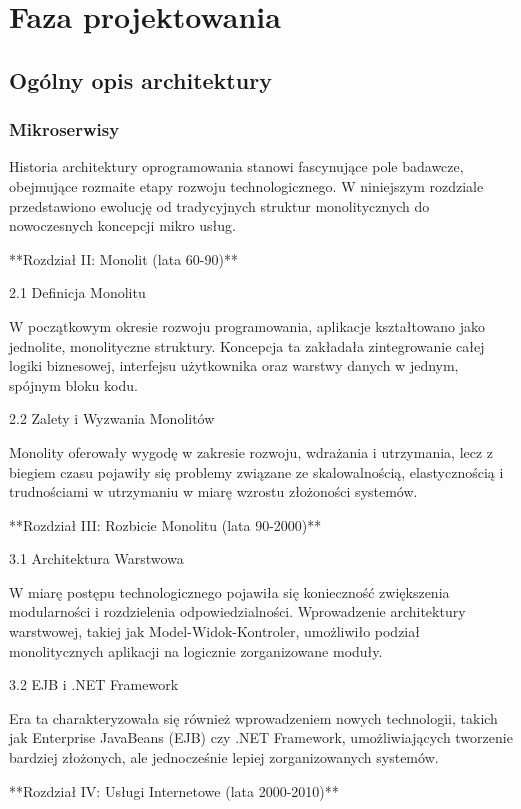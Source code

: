 \section{Faza projektowania}

\subsection{Ogólny opis architektury}

\subsubsection{Mikroserwisy}

Historia architektury oprogramowania stanowi fascynujące pole badawcze, obejmujące rozmaite etapy rozwoju technologicznego. W niniejszym rozdziale przedstawiono ewolucję od tradycyjnych struktur monolitycznych do nowoczesnych koncepcji mikro usług.

**Rozdział II: Monolit (lata 60-90)**

2.1 Definicja Monolitu

W początkowym okresie rozwoju programowania, aplikacje kształtowano jako jednolite, monolityczne struktury. Koncepcja ta zakładała zintegrowanie całej logiki biznesowej, interfejsu użytkownika oraz warstwy danych w jednym, spójnym bloku kodu.

2.2 Zalety i Wyzwania Monolitów

Monolity oferowały wygodę w zakresie rozwoju, wdrażania i utrzymania, lecz z biegiem czasu pojawiły się problemy związane ze skalowalnością, elastycznością i trudnościami w utrzymaniu w miarę wzrostu złożoności systemów.

**Rozdział III: Rozbicie Monolitu (lata 90-2000)**

3.1 Architektura Warstwowa

W miarę postępu technologicznego pojawiła się konieczność zwiększenia modularności i rozdzielenia odpowiedzialności. Wprowadzenie architektury warstwowej, takiej jak Model-Widok-Kontroler, umożliwiło podział monolitycznych aplikacji na logicznie zorganizowane moduły.

3.2 EJB i .NET Framework

Era ta charakteryzowała się również wprowadzeniem nowych technologii, takich jak Enterprise JavaBeans (EJB) czy .NET Framework, umożliwiających tworzenie bardziej złożonych, ale jednocześnie lepiej zorganizowanych systemów.

**Rozdział IV: Usługi Internetowe (lata 2000-2010)**

